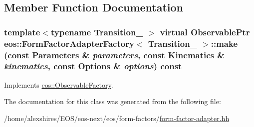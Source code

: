 \subsection{Member Function Documentation}
\hypertarget{classeos_1_1FormFactorAdapterFactory_a87734f36d23509771fab23e13ed60ff3}{
\subsubsection[{make}]{\setlength{\rightskip}{0pt plus 5cm}template$<$typename Transition\_\- $>$ virtual {\bf ObservablePtr} {\bf eos::FormFactorAdapterFactory}$<$ Transition\_\- $>$::make (const {\bf Parameters} \& {\em parameters}, \/  const {\bf Kinematics} \& {\em kinematics}, \/  const {\bf Options} \& {\em options}) const}}
\label{classeos_1_1FormFactorAdapterFactory_a87734f36d23509771fab23e13ed60ff3}


Implements \hyperlink{classeos_1_1ObservableFactory_ac338d98049d8db85548aab9d3c74bcda}{eos::ObservableFactory}.

The documentation for this class was generated from the following file:\begin{DoxyCompactItemize}
\item 
/home/alexshires/EOS/eos-\/next/eos/form-\/factors/\hyperlink{form-factor-adapter_8hh}{form-\/factor-\/adapter.hh}\end{DoxyCompactItemize}
